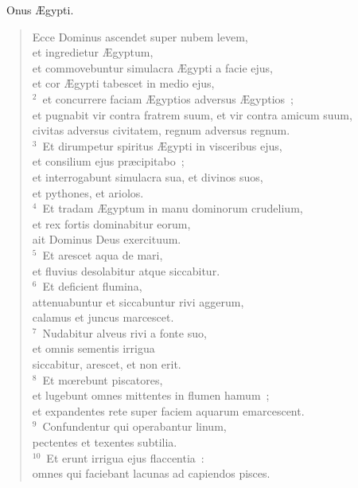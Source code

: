 ~\lettrine[lines=10,image=true,loversize=0.05,lraise=-0.03]{O}{}nus \AE gypti. \begin{flushleft}\begin{verse}\vspace{6pt}Ecce Dominus ascendet super nubem levem,\\ et ingredietur \AE gyptum,\\ et commovebuntur simulacra \AE gypti a facie ejus,\\ et cor \AE gypti tabescet in medio ejus,\\
${}^{2}$~et concurrere faciam \AE gyptios adversus \AE gyptios~;\\ et pugnabit vir contra fratrem suum, et vir contra amicum suum,\\ civitas adversus civitatem, regnum adversus regnum.\\
${}^{3}$~Et dirumpetur spiritus \AE gypti in visceribus ejus,\\ et consilium ejus pr\ae cipitabo~;\\ et interrogabunt simulacra sua, et divinos suos,\\ et pythones, et ariolos.\\
${}^{4}$~Et tradam \AE gyptum in manu dominorum crudelium,\\ et rex fortis dominabitur eorum,\\ ait Dominus Deus exercituum.\\
${}^{5}$~Et arescet aqua de mari,\\ et fluvius desolabitur atque siccabitur.\\
${}^{6}$~Et deficient flumina,\\ attenuabuntur et siccabuntur rivi aggerum,\\ calamus et juncus marcescet.\\
${}^{7}$~Nudabitur alveus rivi a fonte suo,\\ et omnis sementis irrigua\\ siccabitur, arescet, et non erit.\\
${}^{8}$~Et mœrebunt piscatores,\\ et lugebunt omnes mittentes in flumen hamum~;\\ et expandentes rete super faciem aquarum emarcescent.\\
${}^{9}$~Confundentur qui operabantur linum,\\ pectentes et texentes subtilia.\\
${}^{10}$~Et erunt irrigua ejus flaccentia~:\\ omnes qui faciebant lacunas ad capiendos pisces.\\

\end{verse}
\end{flushleft}
